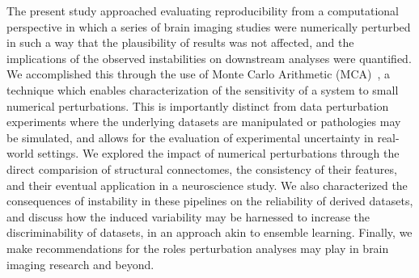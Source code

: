 \documentclass[fleqn,10pt]{SelfArx} %
\newcommand{\new}[1]{{#1}}
\begin{document}
The present study approached evaluating reproducibility from a computational perspective in which a series of brain
imaging studies were numerically perturbed \new{in} such \new{a way} that the plausibility of results was not affected, and the
implications of the observed instabilities \new{on downstream analyses} were quantified. We accomplished this through the use of Monte Carlo
Arithmetic (MCA)~\cite{Parker1997-qq}, a technique which enables characterization of the sensitivity of a system to
small \new{numerical} perturbations. \new{This is importantly distinct from data perturbation experiments where the underlying
datasets are manipulated or pathologies may be simulated, and allows for the evaluation of experimental uncertainty in real-world
settings.} We explored the impact of \new{numerical} perturbations through the direct comparision of structural connectomes,
the consistency of their features, and their eventual application in a neuroscience study. \new{We also characterized the}
consequences \new{of instability in these pipelines on the reliability of derived datasets,} and \new{discuss how the induced
variability may be harnessed to increase the discriminability of datasets, in an approach akin to ensemble learning}.
\new{Finally, we} make recommendations for the roles \new{perturbation} analyses may play in brain imaging research \new{and beyond}.

\end{document}

